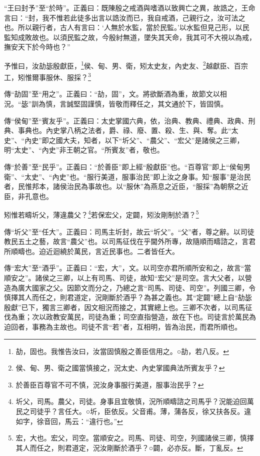 {\noindent\shu{}\fzkt “王曰封予”至“於時”。正義曰：既陳殷之戒酒與嗜酒以致興亡之異，故誥之，王命言曰：“封，我不惟若此徒多出言以誥汝而已，我自戒酒，己親行之，汝可法之也。所以親行者，古人有言曰：‘人無於水監，當於民監。’以水監但見己形，以民監知成敗故也。以須民監之故，今殷紂無道，墜失其天命，我其可不大視以為戒，撫安天下於今時也？” \par}

予惟曰，汝劼毖殷獻臣，\footnote{劼，固也。我惟告汝曰，汝當固慎殷之善臣信用之。○劼，若八反。}侯、甸、男、衛，矧太史友，內史友、\footnote{侯、甸、男、衛之國當慎接之，況太史、內史掌國典法所賓友乎？}越獻臣、百宗工，矧惟爾事服休、服採？\footnote{於善臣百尊官不可不慎，況汝身事服行美道，服事治民乎？}



{\noindent\zhuan{}\fzbyks 傳“劼固”至“用之”。正義曰：“劼，固”，文。將欲斷酒為重，故節文以相況。“毖”訓為慎，言誠堅固謹慎，皆敬而釋任之，其文通於下，皆固慎。 \par}

{\noindent\zhuan{}\fzbyks 傳“侯甸”至“賓友乎”。正義曰：太史掌國六典，依，治典、教典、禮典、政典、刑典、事典也。內史掌八柄之法者，爵、祿、廢、置、殺、生、與、奪。此“太史”、“內史”即之國大夫，知者，以下“圻父”、“農父”、“宏父”是諸侯之三卿，明“太史”、“內史”非王朝之官。“所賓友”者，敬也。 \par}

{\noindent\zhuan{}\fzbyks 傳“於善”至“民乎”。正義曰：“於善臣”即上經“殷獻臣”也。“百尊官”即上“侯甸男衛”、“太史”、“內史”也。“服行美道，服事治民”即上汝之身事。知“服事”是治民者，民惟邦本，諸侯治民為事故也。以“服休”為燕息之近臣，“服採”為朝祭之近臣，非孔意也。 \par}

矧惟若疇圻父，薄違農父？\footnote{圻父，司馬。農父，司徒。身事且宜敬慎，況所順疇諮之司馬乎？況能迫回萬民之司徒乎？言任大。○圻，臣依反。父音甫。薄，蒲各反，徐又扶各反。違如字，徐音回，馬云：“違行也。”}若保宏父，定闢，矧汝剛制於酒？\footnote{宏，大也。宏父，司空。當順安之。司馬、司徒、司空，列國諸侯三卿，慎擇其人而任之，則君道定，況汝剛斷於酒乎？○闢，必亦反。斷，丁亂反。}

{\noindent\zhuan{}\fzbyks 傳“圻父”至“任大”。正義曰：司馬主圻封，故云“圻父”。“父”者，尊之辭。以司徒教民五土之藝，故言“農父”也。以司馬征伐在乎閫外所專，故隨順而疇諮之，言君所順疇也。迫近迴繞於萬民，言近民事也。二者皆任大。 \par}

{\noindent\zhuan{}\fzbyks 傳“宏大”至“酒乎”。正義曰：“宏，大”，文。以司空亦君所順所安和之，故言“當順安之”。諸侯之三卿，以上有司馬、司徒，故知“宏父”是司空。言大父者，以營造為廣大國家之父。因節文而分之，乃總之言“司馬、司徒、司空”。列國三卿，令慎擇其人而任之，則君道定，況剛斷於酒乎？為甚之義也。其“定闢”總上自“劼毖殷獻”已下，獨言三卿者，因文相況而接之，其實總上也。三卿不次者，以司馬征伐為重；次以政教安萬民，司徒為重；司空直指營造，故在下也。司徒言於萬民為迫回者，事務為主故也。司徒不言“若”者，互相明，皆為治民，而君所順也。 \par}

